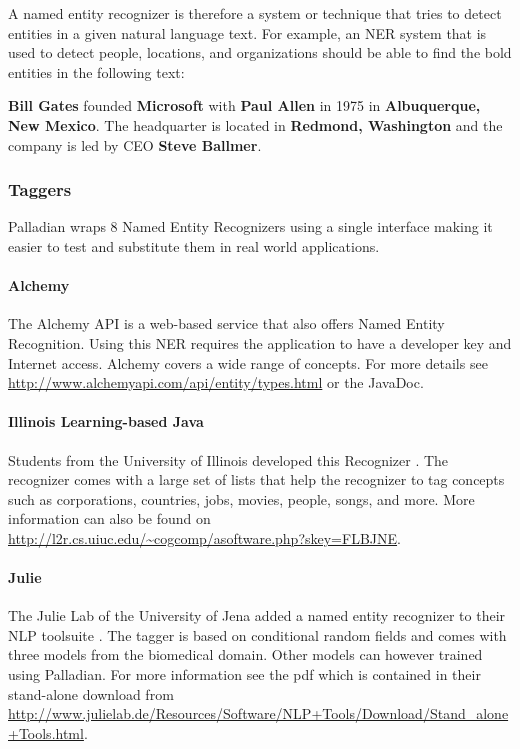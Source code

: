 \documentclass[a4paper,twoside]{book}      %
\begin{document}
A named entity recognizer is therefore a system or technique that tries to detect entities in a given natural language text. For example, an NER system that is used to detect people, locations, and organizations should be able to find the bold entities in the following text:

\textbf{Bill Gates} founded \textbf{ Microsoft} with \textbf{ Paul Allen} in 1975 in \textbf{ Albuquerque, New Mexico}. The headquarter is located in \textbf{ Redmond, Washington} and the company is led by CEO \textbf{ Steve Ballmer}.

\subsubsection{Taggers}
Palladian wraps 8 Named Entity Recognizers using a single interface making it easier to test and substitute them in real world applications.

\paragraph{Alchemy} The Alchemy API is a web-based service that also offers Named Entity Recognition. Using this NER requires the application to have a developer key and Internet access. Alchemy covers a wide range of concepts. For more details see \url{http://www.alchemyapi.com/api/entity/types.html} or the JavaDoc.

\paragraph{Illinois Learning-based Java} Students from the University of Illinois developed this Recognizer \cite{illinoisccg}. The recognizer comes with a large set of lists that help the recognizer to tag concepts such as corporations, countries, jobs, movies, people, songs, and more. More information can also be found on \url{http://l2r.cs.uiuc.edu/~cogcomp/asoftware.php?skey=FLBJNE}.

\paragraph{Julie} The Julie Lab of the University of Jena added a named entity recognizer to their NLP toolsuite \cite{hahn2008overview}. The tagger is based on conditional random fields and comes with three models from the biomedical domain. Other models can however trained using Palladian. For more information see the pdf which is contained in their stand-alone download from \url{http://www.julielab.de/Resources/Software/NLP+Tools/Download/Stand_alone+Tools.html}.
\end{document}
